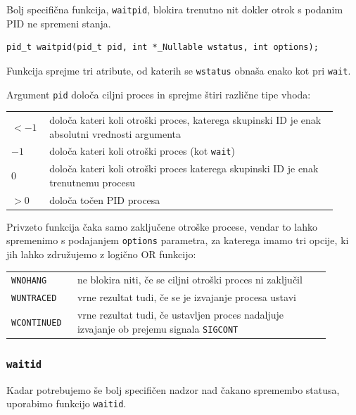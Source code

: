 \documentclass[a4paper,12pt,openright]{book}
\begin{document}
Bolj specifična funkcija, \texttt{waitpid}, blokira trenutno nit dokler otrok s podanim PID ne spremeni stanja.

\begin{lstlisting}[style=func]
	pid_t waitpid(pid_t pid, int *_Nullable wstatus, int options);
\end{lstlisting}

Funkcija sprejme tri atribute, od katerih se \texttt{wstatus} obnaša enako kot pri \texttt{wait}.

Argument \texttt{pid} določa ciljni proces in sprejme štiri različne tipe vhoda:

\begin{tabular}{ p{0.1\linewidth} p{0.82\linewidth} }
	$< -1$ & določa kateri koli otroški proces, katerega skupinski ID je enak absolutni vrednosti argumenta \\
	$-1$   & določa kateri koli otroški proces (kot \texttt{wait})                                          \\
	$0$    & določa kateri koli otroški proces katerega skupinski ID je enak trenutnemu procesu             \\    
	$> 0$  & določa točen PID procesa                                                                       
\end{tabular}

Privzeto funkcija čaka samo zaključene otroške procese, vendar to lahko spremenimo s podajanjem \texttt{options} parametra, za katerega imamo tri opcije, ki jih lahko združujemo z logično OR funkcijo:

\begin{tabular}{ p{0.18\linewidth} p{0.72\linewidth} }
	\texttt{WNOHANG}    & ne blokira niti, če se ciljni otroški proces ni zaključil                                     \\
	\texttt{WUNTRACED}  & vrne rezultat tudi, če se je izvajanje procesa ustavi                                           \\
	\texttt{WCONTINUED} & vrne rezultat tudi, če ustavljen proces nadaljuje izvajanje ob prejemu signala \texttt{SIGCONT} 
\end{tabular}

\subsubsection{\texttt{waitid}}

Kadar potrebujemo še bolj specifičen nadzor nad čakano spremembo statusa, uporabimo funkcijo \texttt{waitid}.
\end{document}
